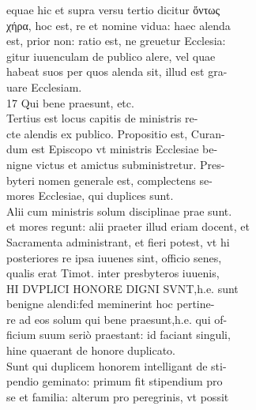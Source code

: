 \documentclass{article}
\begin{document}
\begin{pages}
{                }equae hic et supra versu tertio dicitur ὄντως \\
                χήρα, hoc est, re et nomine vidua: haec alenda \\
                est, prior non: ratio est, ne greuetur Ecclesia: \\
                gitur iuuenculam de publico alere, vel quae \\
                habeat suos per quos alenda sit, illud est gra- \\
                uare Ecclesiam. \\
                17 Qui bene praesunt, etc. \\
                Tertius est locus capitis de ministris re- \\
                cte alendis ex publico. Propositio est, Curan- \\
                dum est Episcopo vt ministris Ecclesiae be- \\
                nigne victus et amictus subministretur. Pres- \\
                byteri nomen generale est, complectens se- \\
                mores Ecclesiae, qui duplices sunt. \\
                Alii cum ministris solum disciplinae prae sunt. \\
                et mores regunt: alii praeter illud eriam docent, et \\
                Sacramenta administrant, et fieri potest, vt hi \\
                posteriores re ipsa iuuenes sint, officio senes, \\
                qualis erat Timot. inter presbyteros iuuenis, \\
                HI DVPLICI HONORE DIGNI SVNT,h.e. sunt \\
                benigne alendi:fed meminerint hoc pertine- \\
                re ad eos solum qui bene praesunt,h.e. qui of- \\
                ficium suum seriò praestant: id faciant singuli, \\
                hine quaerant de honore duplicato. \\
                Sunt qui duplicem honorem intelligant de sti- \\
                pendio geminato: primum fit stipendium pro \\
                se et familia: alterum pro peregrinis, vt possit \\

\end{pages}
\end{document}
